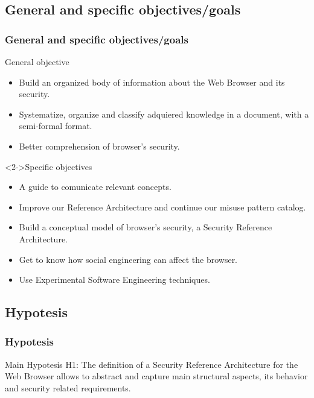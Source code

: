 \documentclass[serif,9pt]{beamer}
\begin{document}
\subsection{General and specific objectives/goals}
\begin{frame}
	\frametitle{General and specific objectives/goals}
	\begin{block}{General objective}
		\begin{small}
		\begin{itemize}
			\item Build an organized body of information about the Web Browser and its security.
			\item Systematize, organize and classify adquiered knowledge in a document, with a semi-formal format.
			\item Better comprehension of browser's security.
		\end{itemize}
		\end{small}
	\end{block}
	\begin{block}<2->{Specific objectives}
		\begin{small}
			\begin{itemize}
				\item A guide to comunicate relevant concepts.
				\item Improve our Reference Architecture and continue our misuse pattern catalog. 
				\item Build a conceptual model of browser's security, a Security Reference Architecture.
				\item Get to know how social engineering can affect the browser.
				\item Use Experimental Software Engineering techniques.
			\end{itemize}
		\end{small}
	\end{block}
\end{frame}


\subsection{Hypotesis}
\begin{frame}
	\frametitle{Hypotesis}	
	\begin{block}{Main Hypotesis}
			H1: The definition of a Security Reference Architecture for the Web Browser allows to abstract and capture main structural aspects, its behavior and security related requirements.
	\end{block}
\end{frame}
\end{document}
